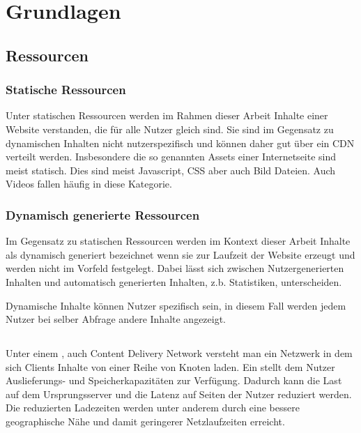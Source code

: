 \chapter{Grundlagen}\label{ch:related_work}

\section{Ressourcen}
\subsection{Statische Ressourcen}
Unter statischen Ressourcen werden im Rahmen dieser Arbeit Inhalte einer Website verstanden, die für alle Nutzer gleich sind. Sie sind im Gegensatz zu dynamischen Inhalten nicht nutzerspezifisch und können daher gut über ein CDN verteilt werden. Insbesondere die so genannten Assets einer Internetseite sind meist statisch. Dies sind meist Javascript, CSS aber auch Bild Dateien. Auch Videos fallen häufig in diese Kategorie.

\subsection{Dynamisch generierte Ressourcen}

Im Gegensatz zu statischen Ressourcen werden im Kontext dieser Arbeit Inhalte als dynamisch generiert bezeichnet wenn sie zur Laufzeit der Website erzeugt und werden nicht im Vorfeld festgelegt. Dabei lässt sich zwischen Nutzergenerierten Inhalten und automatisch generierten Inhalten, z.b. Statistiken, unterscheiden.

Dynamische Inhalte können Nutzer spezifisch sein, in diesem Fall werden jedem Nutzer bei selber Abfrage andere Inhalte angezeigt.

\section{\cdn}
Unter einem \cdn, auch Content Delivery Network versteht man ein Netzwerk in dem sich Clients Inhalte von einer Reihe von Knoten laden. Ein \cdn stellt dem Nutzer Auslieferungs- und Speicherkapazitäten zur Verfügung. Dadurch kann die Last auf dem Ursprungsserver und die Latenz auf Seiten der Nutzer reduziert werden. Die reduzierten Ladezeiten werden unter anderem durch eine bessere geographische Nähe und damit geringerer Netzlaufzeiten erreicht. %

